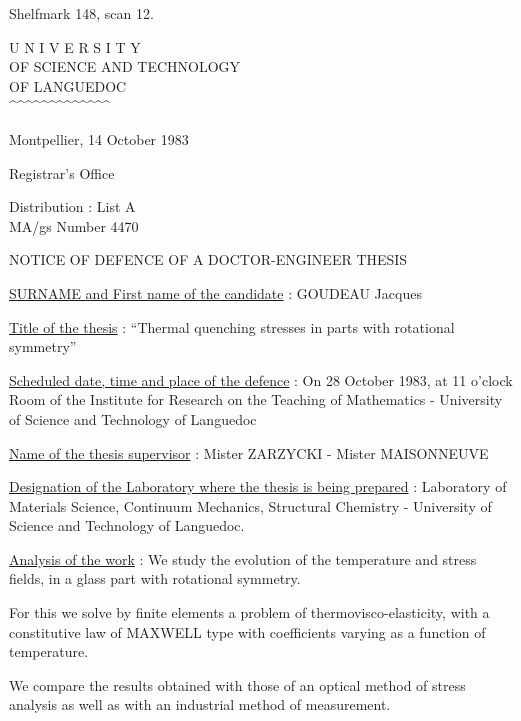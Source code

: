 Shelfmark 148, scan 12.


\begin{center}
U N I V E R S I T Y\\
OF SCIENCE AND TECHNOLOGY\\
OF LANGUEDOC\\
\textasciicircum\textasciicircum\textasciicircum\textasciicircum\textasciicircum\textasciicircum\textasciicircum\textasciicircum\textasciicircum\textasciicircum\textasciicircum\textasciicircum\textasciicircum
\end{center}

Montpellier, 14 October 1983

Registrar's Office

Distribution : List A\\
MA/gs \hfill Number 4470

\begin{center}
NOTICE OF DEFENCE OF A DOCTOR-ENGINEER THESIS

\end{center}

\uline{SURNAME and First name of the candidate} : GOUDEAU Jacques

\uline{Title of the thesis} : ``Thermal quenching stresses in parts with rotational symmetry''

\uline{Scheduled date, time and place of the defence} : On 28 October 1983, at 11 o'clock\\
Room of the Institute for Research on the Teaching of Mathematics - University of Science and Technology of Languedoc

\uline{Name of the thesis supervisor} : Mister ZARZYCKI - Mister MAISONNEUVE

\uline{Designation of the Laboratory where the thesis is being prepared} : Laboratory of Materials Science, Continuum Mechanics, Structural Chemistry - University of Science and Technology of Languedoc.

\uline{Analysis of the work} : We study the evolution of the temperature and stress fields, in a glass part with rotational symmetry.

For this we solve by finite elements a problem of thermovisco-elasticity, with a constitutive law of MAXWELL type with coefficients varying as a function of temperature.

We compare the results obtained with those of an optical method of stress analysis as well as with an industrial method of measurement.

